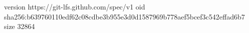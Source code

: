 version https://git-lfs.github.com/spec/v1
oid sha256:b639760110edf62c08cdbe3b955e3d0d1587969b778aef5bcef3c542effad6b7
size 32864
